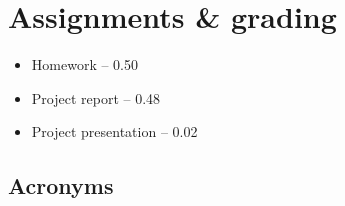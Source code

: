 \documentclass[11pt,letterpaper]{article}
\begin{document}
\section{Assignments \& grading}
\begin{itemize}[begin-vspace=0ex,item-vspace=-0.5ex,begin-extra-vspace=1ex,para-vspace=1ex,left-margin=2.25ex,item-indent=0ex]
    \item Homework -- 0.50
    \item Project report -- 0.48
    \item Project presentation -- 0.02
\end{itemize}


\newpage


\begin{appendices}


    \renewcommand{\thesection}{\Roman{section}}


    \section{Acronyms}
    \printnoidxglossary[title={}]


\end{appendices}
\end{document}
